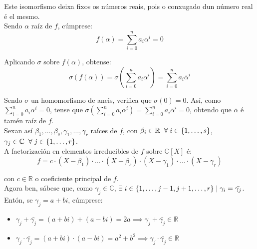\documentclass[twoside]{report}
\theoremstyle{mystyle}
\begin{document}
\noindent Este isomorfismo deixa fixos os números reais, pois o conxugado dun número real é el mesmo.\\

\noindent Sendo $\alpha$ raíz de $f$, cúmprese:
$$f(\alpha) = \sum_{i=0}^{n}{a_{i}\alpha^{i}} = 0 $$

\noindent Aplicando $\sigma$ sobre $f(\alpha)$, obtense:
$$\sigma(f(\alpha)) = \sigma\left(\sum_{i=0}^{n}{a_{i}\alpha^{i}}\right) = \sum_{i=0}^{n}{a_{i}\bar{\alpha}^{i}}$$

\noindent Sendo $\sigma$ un homomorfismo de aneis, verifica que $\sigma(0) = 0$. Así, como $\displaystyle \sum_{i=0}^{n}{a_{i}\alpha^{i}} = 0$, tense que $\sigma\left(\displaystyle \sum_{i=0}^{n}{a_{i}\alpha^{i}}\right) = \displaystyle \sum_{i=0}^{n}{a_{i}\bar{\alpha}^{i}} = 0$, obtendo que $\bar{\alpha}$ é tamén raíz de $f$.\\

\noindent Sexan así $\beta_{1}, \ldots, \beta_{s},\gamma_{1}, \ldots, \gamma_{r}$ raíces de $f$, con $\beta_{i} \in \mathbb{R} \hspace{2mm} \forall \hspace{1mm} i \in \{1, \ldots, s\}$, $\gamma_{j} \in \mathbb{C} \hspace{2mm} \forall \hspace{1mm} j \in \{1, \ldots, r\}$.\\

\noindent A factorización en elementos irreducibles de $f$ sobre $\mathbb{C}[X]$ é:
$$f = c \cdot (X - \beta_{1}) \cdot \ldots \cdot (X - \beta_{s}) \cdot (X - \gamma_{1}) \cdot \ldots \cdot (X - \gamma_{r})$$

\noindent con $c \in \mathbb{R}$ o coeficiente principal de $f$.\\

\noindent Agora ben, sábese que, como $\gamma_{j} \in \mathbb{C}$, $\exists \hspace{1mm} i \in \{1, \ldots, j-1, j+1, \ldots, r\} \hspace{1mm} | \hspace{1mm} \gamma_{i} = \bar{\gamma_{j}}$. Entón, se $\gamma_{j} = a + bi$, cúmprese:
\begin{itemize}
    \item $\gamma_{j} + \bar{\gamma_{j}} = (a + bi) + (a - bi) = 2a \implies \gamma_{j} + \bar{\gamma_{j}} \in \mathbb{R}$
    \item $\gamma_{j} \cdot \bar{\gamma_{j}} = (a + bi) \cdot (a - bi) = a^{2} + b^{2} \implies \gamma_{j} \cdot \bar{\gamma_{j}} \in \mathbb{R}$
\end{itemize}
\end{document}
